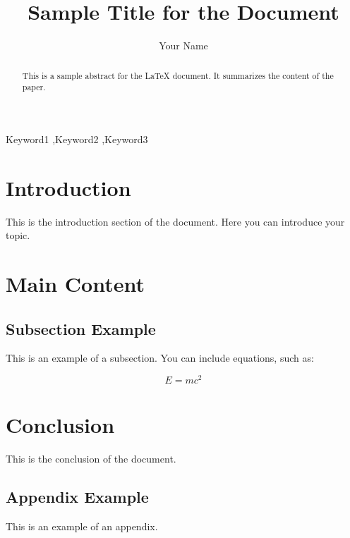 \documentclass[preprint,authoryear]{elsarticle}
\begin{document}
\title{Sample Title for the Document}
\author{Your Name}
\address{Your Institution}

\begin{abstract}
This is a sample abstract for the LaTeX document. It summarizes the content of the paper.
\end{abstract}

\begin{keyword}
Keyword1 \sep Keyword2 \sep Keyword3
\end{keyword}

\section{Introduction}
This is the introduction section of the document. Here you can introduce your topic.

\section{Main Content}
\subsection{Subsection Example}
This is an example of a subsection. You can include equations, such as:

\begin{equation}
E = mc^2
\end{equation}

\section{Conclusion}
This is the conclusion of the document.

\begin{appendices}
\section{Appendix Example}
This is an example of an appendix.
\end{appendices}
\end{document}
